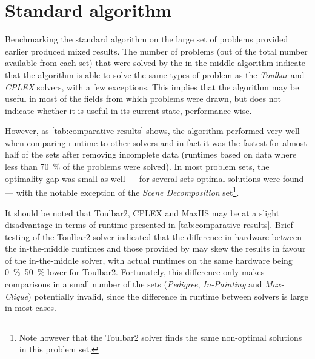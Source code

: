 \section{Standard algorithm}
Benchmarking the standard algorithm on the large set of problems provided earlier produced mixed results.
The number of problems (out of the total number available from each set) that were solved by the in-the-middle algorithm indicate that the algorithm is able to solve the same types of problem as the \emph{Toulbar} and \emph{CPLEX} solvers, with a few exceptions.
This implies that the algorithm may be useful in most of the fields from which problems were drawn, but does not indicate whether it is useful in its current state, performance-wise.

However, as \cref{tab:comparative-results} shows, the algorithm performed very well when comparing runtime to other solvers and in fact it was the fastest for almost half of the sets after removing incomplete data (runtimes based on data where less than \SI{70}{\percent} of the problems were solved).
In most problem sets, the optimality gap was small as well --- for several sets optimal solutions were found --- with the notable exception of the \emph{Scene Decomposition} set\footnote{Note however that the Toulbar2 solver finds the same non-optimal solutions in this problem set.}.

It should be noted that Toulbar2, CPLEX and MaxHS may be at a slight disadvantage in terms of runtime presented in \cref{tab:comparative-results}.
Brief testing of the Toulbar2 solver indicated that the difference in hardware between the in-the-middle runtimes and those provided by \textcite{deGivry14} may skew the results in favour of the in-the-middle solver, with actual runtimes on the same hardware being \SIrange{0}{50}{\percent} lower for Toulbar2.
Fortunately, this difference only makes comparisons in a small number of the sets (\emph{Pedigree}, \emph{In-Painting} and \emph{Max-Clique}) potentially invalid, since the difference in runtime between solvers is large in most cases.

